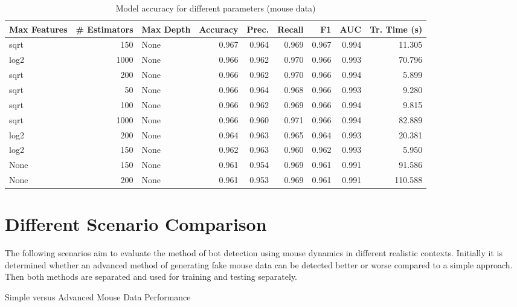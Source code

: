 \documentclass[
    fontsize=12pt,
    headings=small,
    parskip=half,           %
    bibliography=totoc,
    numbers=noenddot,       %
    open=any,               %
    final,                   %
    table
]{scrreprt}
\begin{document}
\begin{table}
    \begin{center}
        \begin{tabular}{lrlrrrrrr}
            \toprule Max Features & \# Estimators & Max Depth & Accuracy & Prec. & Recall & F1 & AUC & Tr. Time (s) \\
            \midrule
            sqrt & 150 & None & 0.967 & 0.964 & 0.969 & 0.967 & 0.994 & 11.305 \\
            log2 & 1000 & None & 0.966 & 0.962 & 0.970 & 0.966 & 0.993 & 70.796 \\
            \rowcolor{green}
            sqrt & 200 & None & 0.966 & 0.962 & 0.970 & 0.966 & 0.994 & 5.899 \\
            sqrt & 50 & None & 0.966 & 0.964 & 0.968 & 0.966 & 0.993 & 9.280 \\
            sqrt & 100 & None & 0.966 & 0.962 & 0.969 & 0.966 & 0.994 & 9.815 \\
            sqrt & 1000 & None & 0.966 & 0.960 & 0.971 & 0.966 & 0.994 & 82.889 \\
            log2 & 200 & None & 0.964 & 0.963 & 0.965 & 0.964 & 0.993 & 20.381 \\
            log2 & 150 & None & 0.962 & 0.963 & 0.960 & 0.962 & 0.993 & 5.950 \\
            None & 150 & None & 0.961 & 0.954 & 0.969 & 0.961 & 0.991 & 91.586 \\
            None & 200 & None & 0.961 & 0.953 & 0.969 & 0.961 & 0.991 & 110.588 \\
            \bottomrule
        \end{tabular}
    \end{center}
    \caption{Model accuracy for different parameters (mouse data)}
    \label{table:mouse_params}
\end{table}

\section{Different Scenario Comparison}

The following scenarios aim to evaluate the method of bot detection using mouse dynamics in different realistic contexts. Initially it is determined whether an advanced method of generating fake mouse data can be detected better or worse compared to a simple approach. Then both methods are separated and used for training and testing separately. 

Simple versus Advanced Mouse Data Performance
\end{document}
